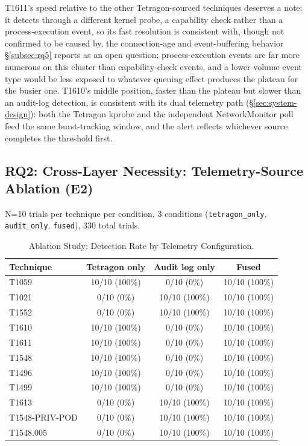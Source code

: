 \documentclass{ieeeaccess}
\begin{document}
T1611's speed relative to the other Tetragon-sourced techniques
deserves a note: it detects through a different kernel probe, a
capability check rather than a process-execution event, so its fast
resolution is consistent with, though not confirmed to be caused by,
the connection-age and event-buffering behavior \S\ref{subsec:rq5} reports as
an open question; process-execution events are far more numerous on
this cluster than capability-check events, and a lower-volume event
type would be less exposed to whatever queuing effect produces the
plateau for the busier one. T1610's middle position, faster than the
plateau but slower than an audit-log detection, is consistent with its
dual telemetry path (\S\ref{sec:system-design}): both the Tetragon kprobe and the
independent NetworkMonitor poll feed the same burst-tracking window,
and the alert reflects whichever source completes the threshold
first.

\subsection{RQ2: Cross-Layer Necessity: Telemetry-Source Ablation (E2)}
\label{subsec:rq2}

N=10 trials per technique per condition, 3 conditions
(\texttt{tetragon\_only}, \texttt{audit\_only}, \texttt{fused}), 330 total trials.

\begin{table}[!t]
\centering
\caption{Ablation Study: Detection Rate by Telemetry Configuration.}
\label{tab:ablation}
\tablebodyfont
\begin{tabular}{@{}lccc@{}}
\toprule
\textbf{Technique} & \textbf{Tetragon only} & \textbf{Audit log only} & \textbf{Fused} \\
\midrule
T1059 & 10/10 (100\%) & 0/10 (0\%) & 10/10 (100\%) \\
T1021 & 0/10 (0\%) & 10/10 (100\%) & 10/10 (100\%) \\
T1552 & 0/10 (0\%) & 10/10 (100\%) & 10/10 (100\%) \\
T1610 & 10/10 (100\%) & 0/10 (0\%) & 10/10 (100\%) \\
T1611 & 10/10 (100\%) & 0/10 (0\%) & 10/10 (100\%) \\
T1548 & 10/10 (100\%) & 0/10 (0\%) & 10/10 (100\%) \\
T1496 & 10/10 (100\%) & 0/10 (0\%) & 10/10 (100\%) \\
T1499 & 10/10 (100\%) & 0/10 (0\%) & 10/10 (100\%) \\
T1613 & 0/10 (0\%) & 10/10 (100\%) & 10/10 (100\%) \\
T1548-PRIV-POD & 0/10 (0\%) & 10/10 (100\%) & 10/10 (100\%) \\
T1548.005 & 0/10 (0\%) & 10/10 (100\%) & 10/10 (100\%) \\
\bottomrule
\end{tabular}
\end{table}
\end{document}
